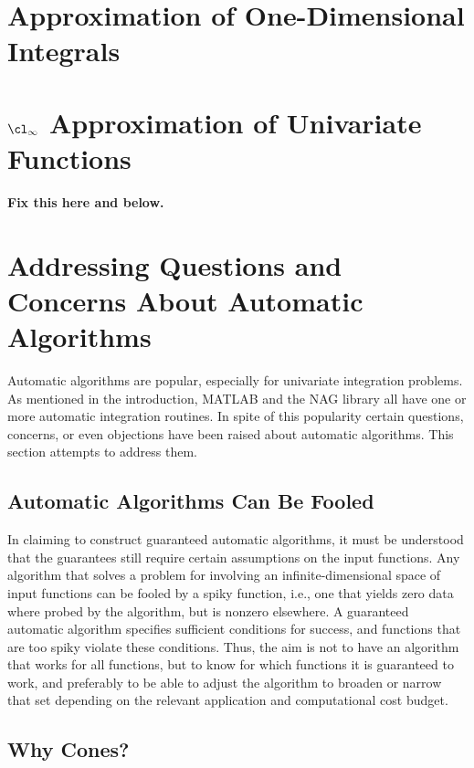 \documentclass[]{elsarticle}
\theoremstyle{definition}
\theoremstyle{remark}
\begin{document}
\section{Approximation of One-Dimensional Integrals} \label{integsec}



\section{$\cl_{\infty}$ Approximation of Univariate Functions} \label{approxsec}



{\bf Fix this here and below.}

\section{Addressing Questions and Concerns About Automatic Algorithms} \label{overcomesec}

Automatic algorithms are popular, especially for univariate integration problems.  As mentioned in the introduction, MATLAB \cite{TrefEtal12,MAT7.12} and the NAG \cite{NAG23} library all have one or more automatic integration routines.  In spite of this popularity certain questions, concerns, or even objections have been raised about automatic algorithms.  This section attempts to address them.


\subsection{Automatic Algorithms Can Be Fooled}  

In claiming to construct guaranteed automatic algorithms, it must be understood that the guarantees still require certain assumptions on the input functions.  Any algorithm that solves a problem for involving an infinite-dimensional space of input functions can be fooled by a spiky function, i.e., one that yields zero data where probed by the algorithm, but is nonzero elsewhere.  A guaranteed automatic algorithm specifies sufficient conditions for success, and functions that are too spiky violate these conditions.  Thus, the aim is not to have an algorithm that works for all functions, but to know for which functions it is guaranteed to work, and preferably to be able to adjust the algorithm to broaden or narrow that set depending on the relevant application and computational cost budget.

\subsection{Why Cones?}
\end{document}
